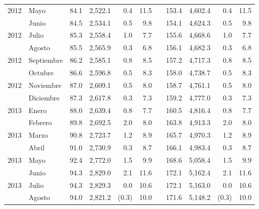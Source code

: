 \begin{center}
\begin{longtable}{llrrrrrrrrr}
		\multicolumn{1}{l}{	2012	}&	Mayo	&	 84.1 	&	 2,522.1 	&	 0.4 	&	 11.5 	&  &	 153.4 	&	 4,602.4 	&	 0.4 	&	 11.5 	\\
		\rowcolor{color1!5!white}\multicolumn{1}{l}{	2012	}&	Junio	&	 84.5 	&	 2,534.1 	&	 0.5 	&	 9.8 	&  &	 154.1 	&	 4,624.3 	&	 0.5 	&	 9.8 	\\
		\multicolumn{1}{l}{	2012	}&	Julio	&	 85.3 	&	 2,558.4 	&	 1.0 	&	 7.7 	&  &	 155.6 	&	 4,668.6 	&	 1.0 	&	 7.7 	\\
		\rowcolor{color1!5!white}\multicolumn{1}{l}{	2012	}&	Agosto	&	 85.5 	&	 2,565.9 	&	 0.3 	&	 6.8 	&  &	 156.1 	&	 4,682.3 	&	 0.3 	&	 6.8 	\\
		\multicolumn{1}{l}{	2012	}&	Septiembre	&	 86.2 	&	 2,585.1 	&	 0.8 	&	 8.5 	&  &	 157.2 	&	 4,717.3 	&	 0.8 	&	 8.5 	\\
		\rowcolor{color1!5!white}\multicolumn{1}{l}{	2012	}&	Octubre	&	 86.6 	&	 2,596.8 	&	 0.5 	&	 8.3 	&  &	 158.0 	&	 4,738.7 	&	 0.5 	&	 8.3 	\\
		\multicolumn{1}{l}{	2012	}&	Noviembre	&	 87.0 	&	 2,609.1 	&	 0.5 	&	 8.0 	&  &	 158.7 	&	 4,761.1 	&	 0.5 	&	 8.0 	\\
		\rowcolor{color1!5!white}\multicolumn{1}{l}{	2012	}&	Diciembre	&	 87.3 	&	 2,617.8 	&	 0.3 	&	 7.3 	&  &	 159.2 	&	 4,777.0 	&	 0.3 	&	 7.3 	\\
		\multicolumn{1}{l}{	2013	}&	Enero	&	 88.0 	&	 2,639.4 	&	 0.8 	&	 7.7 	&  &	 160.5 	&	 4,816.4 	&	 0.8 	&	 7.7 	\\
		\rowcolor{color1!5!white}\multicolumn{1}{l}{	2013	}&	Febrero	&	 89.8 	&	 2,692.5 	&	 2.0 	&	 8.0 	&  &	 163.8 	&	 4,913.3 	&	 2.0 	&	 8.0 	\\
		\multicolumn{1}{l}{	2013	}&	Marzo	&	 90.8 	&	 2,723.7 	&	 1.2 	&	 8.9 	&  &	 165.7 	&	 4,970.3 	&	 1.2 	&	 8.9 	\\
		\rowcolor{color1!5!white}\multicolumn{1}{l}{	2013	}&	Abril	&	 91.0 	&	 2,730.9 	&	 0.3 	&	 8.7 	&  &	 166.1 	&	 4,983.4 	&	 0.3 	&	 8.7 	\\
		\multicolumn{1}{l}{	2013	}&	Mayo	&	 92.4 	&	 2,772.0 	&	 1.5 	&	 9.9 	&  &	 168.6 	&	 5,058.4 	&	 1.5 	&	 9.9 	\\
		\rowcolor{color1!5!white}\multicolumn{1}{l}{	2013	}&	Junio	&	 94.3 	&	 2,829.0 	&	 2.1 	&	 11.6 	&  &	 172.1 	&	 5,162.4 	&	 2.1 	&	 11.6 	\\
		\multicolumn{1}{l}{	2013	}&	Julio	&	 94.3 	&	 2,829.3 	&	 0.0 	&	 10.6 	&  &	 172.1 	&	 5,163.0 	&	 0.0 	&	 10.6 	\\
		\rowcolor{color1!5!white}\multicolumn{1}{l}{	2013	}&	Agosto	&	 94.0 	&	 2,821.2 	&	 (0.3)	&	 10.0 	&  &	 171.6 	&	 5,148.2 	&	 (0.3)	&	 10.0 	\\

\end{longtable}
\end{center}
